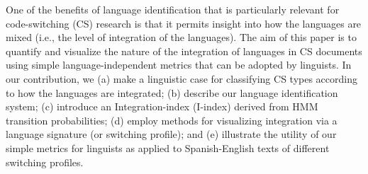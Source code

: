 One of the benefits of language identification that is particularly relevant for code-switching (CS) research is that it permits insight into how the languages are mixed (i.e., the level of integration of the languages). The aim of this paper is to quantify and visualize the nature of the integration of languages in CS documents using simple language-independent metrics that can be adopted by linguists. In our contribution, we (a) make a linguistic case for classifying CS types according to how the languages are integrated; (b) describe our language identification system; (c) introduce an Integration-index (I-index) derived from HMM transition probabilities; (d) employ methods for visualizing integration via a language signature (or switching profile); and (e) illustrate the utility of our simple metrics for linguists as applied to Spanish-English texts of different switching profiles.
